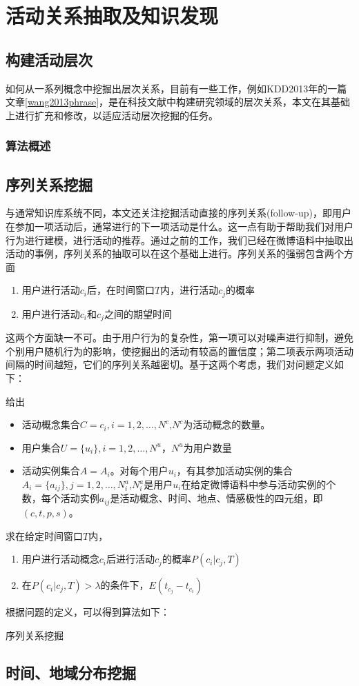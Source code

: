 \chapter{活动关系抽取及知识发现}
\section{构建活动层次}
如何从一系列概念中挖掘出层次关系，目前有一些工作，例如KDD2013年的一篇文章\ref{wang2013phrase}，是在科技文献中构建研究领域的层次关系，本文在其基础上进行扩充和修改，以适应活动层次挖掘的任务。

\subsection{算法概述}


\section{序列关系挖掘}
与通常知识库系统不同，本文还关注挖掘活动直接的序列关系(follow-up)，即用户在参加一项活动后，通常进行的下一项活动是什么。这一点有助于帮助我们对用户行为进行建模，进行活动的推荐。通过之前的工作，我们已经在微博语料中抽取出活动的事例，序列关系的抽取可以在这个基础上进行。序列关系的强弱包含两个方面
\begin{enumerate}
\item 用户进行活动$c_i$后，在时间窗口$T$内，进行活动$c_j$的概率
\item 用户进行活动$c_i$和$c_j$之间的期望时间
\end{enumerate}
这两个方面缺一不可。由于用户行为的复杂性，第一项可以对噪声进行抑制，避免个别用户随机行为的影响，使挖掘出的活动有较高的置信度；第二项表示两项活动间隔的时间越短，它们的序列关系越密切。基于这两个考虑，我们对问题定义如下：

\begin{problem}[序列关系挖掘]
给出
\begin{itemize}
\item 活动概念集合$C={c_i},i=1,2,\ldots,N^c$,$N^c$为活动概念的数量。
\item 用户集合$U=\{u_i\},i=1,2,\ldots,N^u$，$N^u$为用户数量
\item 活动实例集合$A = {A_i}$。对每个用户$u_i$，有其参加活动实例的集合$A_i = \{a_{ij}\}, j=1,2,\ldots,N_i^a$,$N_i^a$是用户$u_i$在给定微博语料中参与活动实例的个数，每个活动实例$a_{ij}$是活动概念、时间、地点、情感极性的四元组，即$(c,t,p,s)$。
\end{itemize}
求在给定时间窗口$T$内，
\begin{enumerate}
\item 用户进行活动概念$c_i$后进行活动$c_j$的概率$P(c_i|c_j,T)$
\item 在$P(c_i|c_j,T)>\lambda$的条件下，$E(t_{c_j} - t_{c_i})$
\end{enumerate}
\end{problem}

根据问题的定义，可以得到算法如下：

\begin{algorithm}
  \caption{序列关系挖掘 }
  
\end{algorithm}


\section{时间、地域分布挖掘}
